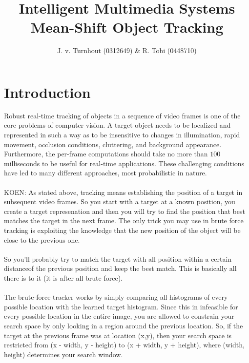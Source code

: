 \documentclass[a4paper,11pt]{article}
\title{Intelligent Multimedia Systems\\Mean-Shift Object Tracking}
\author{J. v. Turnhout (0312649) \& R. Tobi (0448710)}
\begin{document}
	\maketitle


	\section*{Introduction}
		Robust real-time tracking of objects in a sequence of video frames is one of
		the core problems of computer vision. A target object needs to be localized
		and represented in such a way as to be insensitive to changes in illumination,
		rapid movement, occlusion conditions, cluttering, and background appearance.
		Furthermore, the per-frame computations should take no more than $100$
		milliseconds to be useful for real-time applications. These challenging
		conditions have led to many different approaches, most probabilistic in
		nature.
		\\ \\
		KOEN:
		As stated above, tracking means establishing the position of a target
		in subsequent video frames.  So you start with a target at a known
		position, you create a target represenation and then you will try to
		find the position that best matches the target in the next frame.
		The only trick you may use in brute force tracking is exploiting
		the knowledge that the new position of the object will be close
		to the previous one.
		\\ \\
		So you'll probably try to match the target with all position within
		a certain distanceof the previous position and keep the best match.
		This is basically all there is to it (it is after all brute force).
		\\ \\
		The brute-force tracker works by simply comparing all histograms
		of every possible location with the learned target histogram. Since
		this in infeasible for every possible location in the entire image,
		you are allowed to constrain your search space by only looking in a
		region around the previous location. So, if the target at the previous
		frame was at location (x,y), then your search space is restricted from
		(x - width, y - height) to (x + width, y + height), where (width, height)
		determines your search window.
		\\ \\
\end{document}
